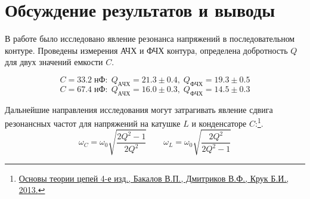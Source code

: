 \section*{Обсуждение результатов и выводы}

В работе было исследовано явление резонанса напряжений в последовательном контуре. Проведены измерения АЧХ и ФЧХ контура, определена добротность $Q$ для двух значений емкости $C$.

$$ C = 33.2 \; нФ:\; Q_{АЧХ} = 21.3 \pm 0.4, \; Q_{ФЧХ} = 19.3 \pm 0.5 $$
$$ C = 67.4 \; нФ:\; Q_{АЧХ} = 16.0 \pm 0.3, \; Q_{ФЧХ} = 14.5 \pm 0.3 $$

Дальнейшие направления исследования могут затрагивать явление сдвига резонансных частот для напряжений на катушке $L$ и конденсаторе $C$:\footnote{
	\href{http://www.techbook.ru/book.php?id_book=579}{Основы теории цепей 4-е изд., Бакалов В.П., Дмитриков В.Ф., Крук Б.И., 2013.}
}.
$$ \omega_C = \omega_0 \sqrt{\frac{2 Q^2 - 1}{2 Q^2}} \qquad \omega_L = \omega_0 \sqrt{\frac{2 Q^2}{2 Q^2 - 1}} $$